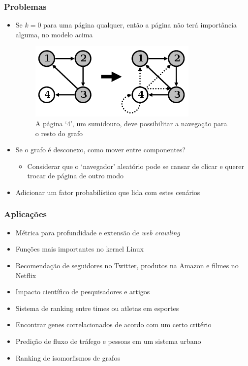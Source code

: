 \documentclass{beamer}
\begin{document}
\begin{frame}
    \frametitle{Problemas}
    \begin{itemize}
        \item Se $k = 0$ para uma página qualquer, então a página não terá
        importância alguma, no modelo acima
        \begin{figure}
            \includegraphics[scale=0.35]{pr_2}
            \caption{\tiny{A página `4', um sumidouro, deve possibilitar a
            navegação para o resto do grafo}}
        \end{figure}
        \item Se o grafo é desconexo, como mover entre componentes?
        \begin{itemize}
            \item Considerar que o `navegador' aleatório pode se cansar de
            clicar e querer trocar de página de outro modo
        \end{itemize}
        \item Adicionar um fator probabilístico que lida com estes cenários
    \end{itemize}
\end{frame}

\begin{frame}
    \frametitle{Aplicações}
    \begin{itemize}
        \item Métrica para profundidade e extensão de \textit{web crawling}
        \item Funções mais importantes no kernel Linux
        \item Recomendação de seguidores no Twitter, produtos na Amazon e
        filmes no Netflix
        \item Impacto científico de pesquisadores e artigos
        \item Sistema de ranking entre times ou atletas em esportes
        \item Encontrar genes correlacionados de acordo com um certo critério
        \item Predição de fluxo de tráfego e pessoas em um sistema urbano
        \item Ranking de isomorfismos de grafos
    \end{itemize}
\end{frame}
\end{document}
